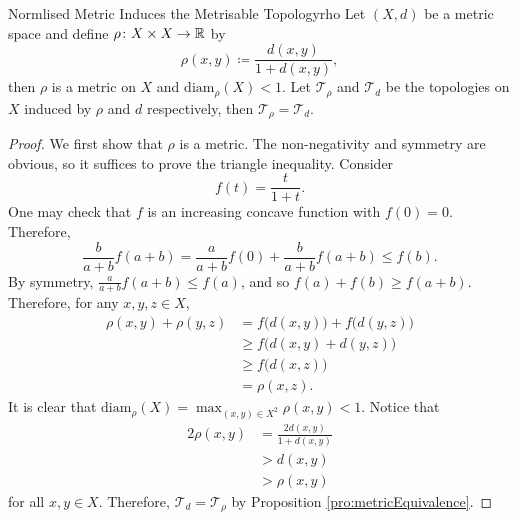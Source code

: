\documentclass[math]{amznotes}
\theoremstyle{remark}
\begin{document}
\begin{probox}{Normlised Metric Induces the Metrisable Topology}{rho}
    Let $\left(X, d\right)$ be a metric space and define $\rho \colon X \times X \to \mathbb{R}$ by 
    \begin{equation*}
        \rho\left(x, y\right) \coloneqq \frac{d\left(x, y\right)}{1 + d\left(x, y\right)},
    \end{equation*}
    then $\rho$ is a metric on $X$ and $\mathrm{diam}_{\rho}\left(X\right) < 1$. Let $\mathcal{T}_{\rho}$ and $\mathcal{T}_d$ be the topologies on $X$ induced by $\rho$ and $d$ respectively, then $\mathcal{T}_{\rho} = \mathcal{T}_d$.
    \tcblower
    \begin{proof}
        We first show that $\rho$ is a metric. The non-negativity and symmetry are obvious, so it suffices to prove the triangle inequality. Consider 
        \begin{equation*}
            f\left(t\right) = \frac{t}{1 + t}.
        \end{equation*}
        One may check that $f$ is an increasing concave function with $f\left(0\right) = 0$. Therefore,
        \begin{equation*}
            \frac{b}{a + b}f\left(a + b\right) = \frac{a}{a + b}f\left(0\right) + \frac{b}{a + b}f\left(a + b\right) \leq f\left(b\right).
        \end{equation*}
        By symmetry, $\frac{a}{a + b}f\left(a + b\right) \leq f\left(a\right)$, and so $f\left(a\right) + f\left(b\right) \geq f\left(a + b\right)$. Therefore, for any $x, y, z \in X$, 
        \begin{align*}
            \rho\left(x, y\right) + \rho\left(y, z\right) & = f\bigl(d\left(x, y\right)\bigr) + f\bigl(d\left(y, z\right)\bigr) \\
            & \geq f\bigl(d\left(x, y\right) + d\left(y, z\right)\bigr) \\
            & \geq f\bigl(d\left(x, z\right)\bigr) \\
            & = \rho\left(x, z\right).
        \end{align*}
        It is clear that $\mathrm{diam}_{\rho}\left(X\right) = \max_{\left(x, y\right) \in X^2}\rho\left(x, y\right) < 1$. Notice that 
        \begin{align*}
            2\rho\left(x, y\right) & = \frac{2d\left(x, y\right)}{1 + d\left(x, y\right)} \\
            & > d\left(x, y\right) \\
            & > \rho\left(x, y\right)
        \end{align*}
        for all $x, y \in X$. Therefore, $\mathcal{T}_d = \mathcal{T}_{\rho}$ by Proposition \ref{pro:metricEquivalence}.
    \end{proof}
\end{probox}
\end{document}
